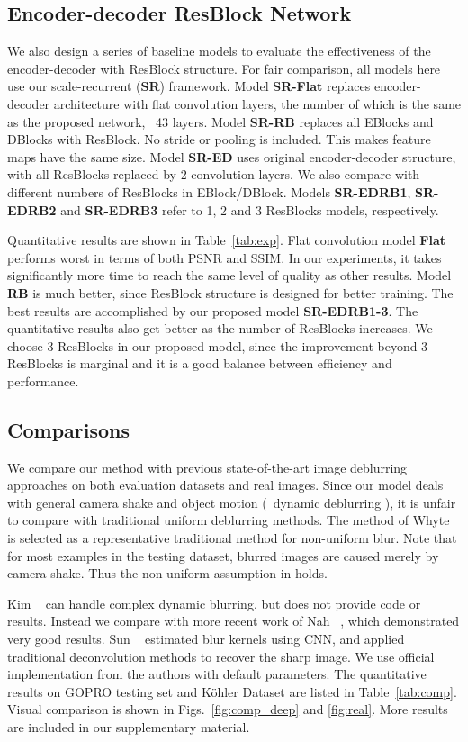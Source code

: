 \documentclass[10pt,twocolumn,letterpaper]{article}
\begin{document}
\subsection{Encoder-decoder ResBlock Network}
We also design a series of baseline models to evaluate the effectiveness of the encoder-decoder with ResBlock structure. For fair comparison, all models here use our scale-recurrent (\textbf{SR}) framework. Model \textbf{SR-Flat} replaces encoder-decoder architecture with flat convolution layers, the number of which is the same as the proposed network, \ie~43 layers. Model \textbf{SR-RB} replaces all EBlocks and DBlocks with ResBlock. No stride or pooling is included. This makes feature maps have the same size. Model \textbf{SR-ED} uses original encoder-decoder structure, with all ResBlocks replaced by 2 convolution layers. We also compare with different numbers of ResBlocks in EBlock/DBlock. Models \textbf{SR-EDRB1}, \textbf{SR-EDRB2} and \textbf{SR-EDRB3} refer to 1, 2 and 3 ResBlocks models, respectively.

Quantitative results are shown in Table~\ref{tab:exp}. Flat convolution model \textbf{Flat} performs worst in terms of both PSNR and SSIM. In our experiments, it takes significantly more time to reach the same level of quality as other results. Model \textbf{RB} is much better, since ResBlock structure is designed for better training. The best results are accomplished by our proposed model \textbf{SR-EDRB1-3}. The quantitative results also get better as the number of ResBlocks increases. We choose 3 ResBlocks in our proposed model, since the improvement beyond 3 ResBlocks is marginal and it is a good balance between efficiency and performance.


\subsection{Comparisons}
We compare our method with previous state-of-the-art image deblurring approaches on both evaluation datasets and real images. Since our model deals with general camera shake and object motion (\ie~dynamic deblurring \cite{hyun2013dynamic}), it is unfair to compare with traditional uniform deblurring methods. The method of Whyte \etal~\cite{whyte2012non} is selected as a representative traditional method for non-uniform blur. Note that for most examples in the testing dataset, blurred images are caused merely by camera shake. Thus the non-uniform assumption in \cite{whyte2012non} holds. 

Kim \etal~\cite{hyun2013dynamic} can handle complex dynamic blurring, but does not provide code or results. Instead we compare with more recent work of Nah \etal~\cite{nah2017deep}, which demonstrated very good results. Sun \etal~\cite{sun2015learning} estimated blur kernels using CNN, and applied traditional deconvolution methods to recover the sharp image. We use official implementation from the authors with default parameters. The quantitative results on GOPRO testing set and K{\"o}hler Dataset \cite{kohler2012recording} are listed in Table~\ref{tab:comp}. Visual comparison is shown in Figs.~\ref{fig:comp_deep} and \ref{fig:real}. More results are included in our supplementary material. 
\end{document}
